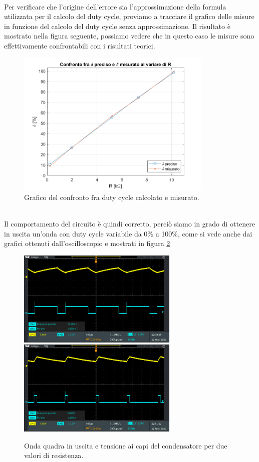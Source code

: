 \documentclass{report}
\begin{document}
\\Per verificare che l'origine dell'errore sia l'approssimazione della formula utilizzata per il calcolo del duty cycle, proviamo a tracciare il grafico delle misure in funzione del calcolo del duty cycle senza approssimazione. Il risultato è mostrato nella figura seguente, possiamo vedere che in questo caso le misure sono effettivamente confrontabili con i risultati teorici.
\begin{figure}[h!]
	\centering
	\includegraphics[height=7cm]{immagini/graficomis4_prec}
	\caption{Grafico del confronto fra duty cycle calcolato e misurato.}
	\label{figura:grafico4_prec}
\end{figure}
\\Il comportamento del circuito è quindi corretto, perciò siamo in grado di ottenere in uscita un'onda con duty cycle variabile da 0\% a 100\%, come si vede anche dai grafici ottenuti dall'oscilloscopio e mostrati in figura \ref{figura:TEK00032e36}
\begin{figure}[h!]
	\centering
	\includegraphics[height=4.6cm]{immagini/TEK00032}
	\includegraphics[height=4.6cm]{immagini/TEK00036}
	\caption{Onda quadra in uscita e tensione ai capi del condensatore per due valori di resistenza.}
	\label{figura:TEK00032e36}
\end{figure}

\end{document}
